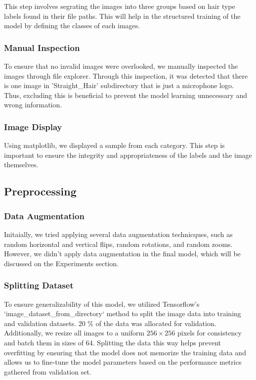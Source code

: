 This step involves segrating the images into three groups based on hair type labels found in their file paths. This will help in the structured training of the model by defining the classes of each images.

\subsubsection{Manual Inspection}

To ensure that no invalid images were overlooked, we manually inspected the images through file explorer. Through this inspection, it was detected that there is one image in 'Straight_Hair' subdirectory that is just a microphone logo. Thus, excluding this is beneficial to prevent the model learning unnecessary and wrong information.

\subsubsection{Image Display}

Using matplotlib, we displayed a sample from each category. This step is important to ensure the integrity and appropriateness of the labels and the image themselves.

\subsection{Preprocessing}

\subsubsection{Data Augmentation}

Initaially, we tried applying several data augmentation technicques, such as random horizontal and vertical flips, random rotations, and random zooms. However, we didn't apply data augmentation in the final model, which will be discussed on the Experiments section.

\subsubsection{Splitting Dataset}

To ensure generalizability of this model, we utilized Tensorflow's `image_dataset_from_directory` method to split the image data into training and validation datasets. 20 \% of the data was allocated for validation. Additionally, we resize all images to a uniform \(256 \times 256\) pixels for consistency and batch them in sizes of 64. Splitting the data this way helps prevent overfitting by ensuring that the model does not memorize the training data and allows us to fine-tune the model parameters based on the performance metrics gathered from validation set.


